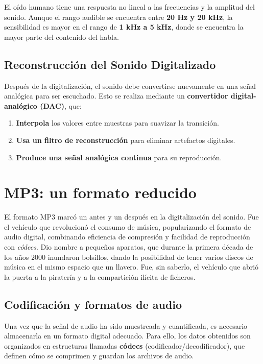 El oído humano tiene una respuesta no lineal a las frecuencias y la amplitud del sonido. Aunque el rango audible se encuentra entre \textbf{20 Hz y 20 kHz}, la sensibilidad es mayor en el rango de \textbf{1 kHz a 5 kHz}, donde se encuentra la mayor parte del contenido del habla.

\subsection{Reconstrucción del Sonido Digitalizado}

Después de la digitalización, el sonido debe convertirse nuevamente en una señal analógica para ser escuchado. Esto se realiza mediante un \textbf{convertidor digital-analógico (DAC)}, que:
\begin{enumerate}
    \item \textbf{Interpola} los valores entre muestras para suavizar la transición.
    \item \textbf{Usa un filtro de reconstrucción} para eliminar artefactos digitales.
    \item \textbf{Produce una señal analógica continua} para su reproducción.
\end{enumerate}

\section{MP3: un formato reducido}

El formato MP3 marcó un antes y un después en la digitalización del sonido. Fue el vehículo que revolucionó el consumo de música, popularizando el formato de audio digital, combinando eficiencia de compresión y facilidad de reproducción con \emph{códecs}. Dio nombre a pequeños aparatos, que durante la primera década de los años 2000 inundaron bolsillos, dando la posibilidad de tener varios discos de música en el mismo espacio que un llavero. Fue, sin saberlo, el vehículo que abrió la puerta a la piratería y a la compartición ilícita de ficheros.

\subsection{Codificación y formatos de audio}

Una vez que la señal de audio ha sido muestreada y cuantificada, es necesario almacenarla en un formato digital adecuado. Para ello, los datos obtenidos son organizados en estructuras llamadas \textbf{códecs} (codificador/decodificador), que definen cómo se comprimen y guardan los archivos de audio.

